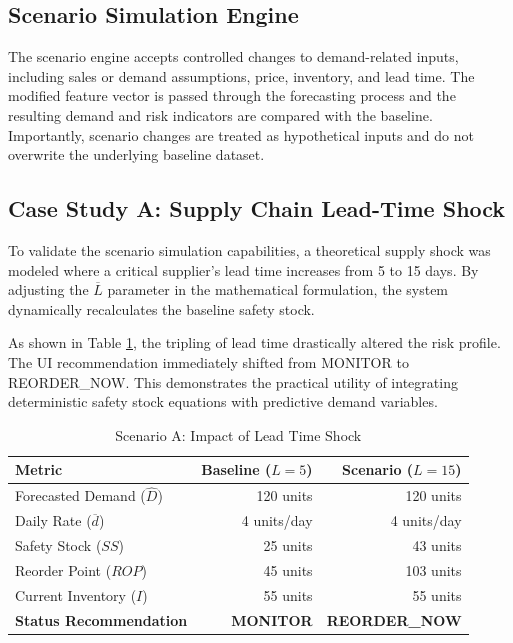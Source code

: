 \documentclass[9pt,conference]{IEEEtran}
\providecommand{\syscite}[1]{}
\begin{document}
\subsection{Scenario Simulation Engine}
The scenario engine accepts controlled changes to demand-related inputs, including sales or demand assumptions, price, inventory, and lead time. \syscite{[cite: 1]} The modified feature vector is passed through the forecasting process and the resulting demand and risk indicators are compared with the baseline. \syscite{[cite: 1]} Importantly, scenario changes are treated as hypothetical inputs and do not overwrite the underlying baseline dataset. \syscite{[cite: 1]}

\subsection{Case Study A: Supply Chain Lead-Time Shock}
To validate the scenario simulation capabilities, a theoretical supply shock was modeled where a critical supplier's lead time increases from 5 to 15 days. By adjusting the $\overline{L}$ parameter in the mathematical formulation, the system dynamically recalculates the baseline safety stock. 

As shown in Table \ref{tab:scenarioA}, the tripling of lead time drastically altered the risk profile. The UI recommendation immediately shifted from MONITOR to REORDER\_NOW. This demonstrates the practical utility of integrating deterministic safety stock equations with predictive demand variables.

\begin{table}[htbp]
\centering
\caption{Scenario A: Impact of Lead Time Shock}
\begin{tabular}{lrr}
\toprule
\textbf{Metric} & \textbf{Baseline ($L=5$)} & \textbf{Scenario ($L=15$)} \\
\midrule
Forecasted Demand ($\hat{D}$) & 120 units & 120 units \\
Daily Rate ($\overline{d}$) & 4 units/day & 4 units/day \\
Safety Stock ($SS$) & 25 units & 43 units \\
Reorder Point ($ROP$) & 45 units & 103 units \\
Current Inventory ($I$) & 55 units & 55 units \\
\textbf{Status Recommendation} & \textbf{MONITOR} & \textbf{REORDER\_NOW} \\
\bottomrule
\end{tabular}
\label{tab:scenarioA}
\end{table}
\end{document}
